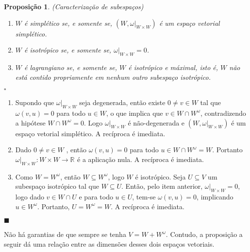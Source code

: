 \documentclass[12pt]{book}
\newtheorem{proposicao}[teorema]{Proposição}
\newenvironment{prova}[1]{$\square$ #1}{\hfill$\blacksquare$}
\newcommand{\espacoSimpleticoOrtogonal}[1]{#1^{\omega}}
\newcommand{\real}[1]{\mathbb{R}^{#1}}
\newcommand{\reta}{\real{}}
\begin{document}
	\begin{proposicao}\label{proposicao_subespaco_simpletico_ortogonal}
		(Caracterização de subespaços)
		\begin{enumerate}
			\item $W$ é simplético se, e somente se, $(W, \omega|_{W \times W})$ é um espaço vetorial simplético.
			
			\item $W$ é isotrópico se, e somente se, $\omega|_{W\times W} = 0$.
			
			\item $W$ é lagrangiano se, e somente se, $W$ é isotrópico e máximal, isto é, $W$ não está contido propriamente em nenhum outro subespaço isotrópico. 
		\end{enumerate}
	\end{proposicao}
	\begin{prova}
		\begin{enumerate}
			\item Supondo que $\omega|_{W \times W}$ seja degenerada, então existe $0\neq v \in W$ tal que $\omega(v, u ) = 0$ para todo $u \in W$, o que implica que $v \in W\cap W^{\omega}$, contradizendo a hipótese $W\cap W^{\omega} =0$. Logo $\omega|_{W \times W} $ é não-degenerada e $(W, \omega|_{W \times W})$ é um espaço vetorial simplético. A recíproca é imediata.
			
			\item Dado $0\neq v \in W $ , então $\omega(v,u) = 0$ para todo $u \in W\cap W^{\omega} = W$. Portanto $\omega|_{W\times W}: W\times W \to \reta$ é a aplicação nula. A recíproca é imediata.
			
			\item  Como $W=W^{\omega}$, então $W\subseteq W^{\omega}$, logo $W$ é isotrópico. Seja $U \subseteq V$ um subespaço isotrópico tal que $W \subseteq U$. Então, pelo item anterior, $\omega|_{W \times W} = 0$, logo dado $v \in W \cap U$ e para todo $u \in U$, tem-se $\omega(v, u) = 0$, implicando $u \in W^{\omega}$. Portanto, $U = W^{\omega} = W$. A recíproca é imediata.
		\end{enumerate}
	\end{prova}
	
	Não há garantias de que sempre se tenha $V = W + \espacoSimpleticoOrtogonal{W}$. Contudo, a proposição a seguir dá uma relação entre as dimensões desses dois espaços vetoriais.
	
\end{document}
